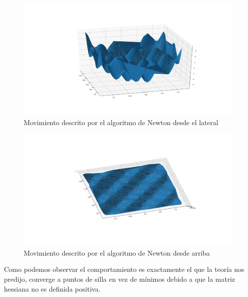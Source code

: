 \documentclass[12pt,a4paper]{article}
\begin{document}
\begin{figure}[H]
	\centering
	\includegraphics[scale=0.42]{./Imagenes/bonus6.png}
	\caption{Movimiento descrito por el algoritmo de Newton desde el lateral}
\end{figure}

\begin{figure}[H]
	\centering
	\includegraphics[scale=0.42]{./Imagenes/bonus7.png}
	\caption{Movimiento descrito por el algoritmo de Newton desde arriba}
\end{figure}

Como podemos observar el comportamiento es exactamente el que la teoría nos predijo, converge a puntos de silla en vez de mínimos debido a que la matriz hessiana no es definida positiva.
\end{document}
